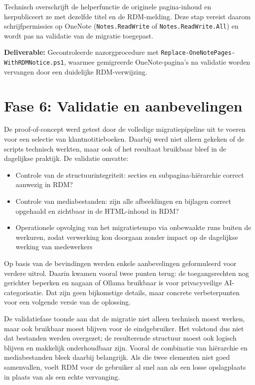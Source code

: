 Technisch overschrijft de helperfunctie de originele pagina-inhoud en herpubliceert ze met dezelfde titel en de RDM-melding. Deze stap vereist daarom schrijfpermissies op OneNote (\texttt{Notes.ReadWrite} of \texttt{Notes.ReadWrite.All}) en wordt pas na validatie van de migratie toegepast.

\textbf{Deliverable:} Gecontroleerde nazorgprocedure met \texttt{Replace-OneNotePages-WithRDMNotice.ps1}, waarmee gemigreerde OneNote-pagina's na validatie worden vervangen door een duidelijke RDM-verwijzing.

\section{Fase 6: Validatie en aanbevelingen}
\label{sec:fase6-validatie}

De proof-of-concept werd getest door de volledige migratiepipeline uit te voeren voor een selectie van klantnotitieboeken. Daarbij werd niet alleen gekeken of de scripts technisch werkten, maar ook of het resultaat bruikbaar bleef in de dagelijkse praktijk. De validatie omvatte:

\begin{itemize}
    \item Controle van de structuurintegriteit: secties en subpagina-hiërarchie correct aanwezig in RDM?
    \item Controle van mediabestanden: zijn alle afbeeldingen en bijlagen correct opgehaald en zichtbaar in de HTML-inhoud in RDM?
    \item Operationele opvolging van het migratietempo via onbewaakte runs buiten de werkuren, zodat verwerking kon doorgaan zonder impact op de dagelijkse werking van medewerkers
\end{itemize}

Op basis van de bevindingen werden enkele aanbevelingen geformuleerd voor verdere uitrol. Daarin kwamen vooral twee punten terug: de toegangsrechten nog gerichter beperken en nagaan of Ollama bruikbaar is voor privacyveilige AI-categorisatie. Dat zijn geen bijkomstige details, maar concrete verbeterpunten voor een volgende versie van de oplossing.

De validatiefase toonde aan dat de migratie niet alleen technisch moest werken, maar ook bruikbaar moest blijven voor de eindgebruiker. Het volstond dus niet dat bestanden werden overgezet; de resulterende structuur moest ook logisch blijven en makkelijk onderhoudbaar zijn. Vooral de combinatie van hiërarchie en mediabestanden bleek daarbij belangrijk. Als die twee elementen niet goed samenvallen, voelt RDM voor de gebruiker al snel aan als een losse opslagplaats in plaats van als een echte vervanging.

